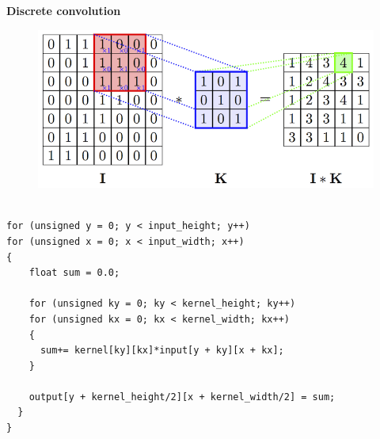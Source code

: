 \documentclass[xcolor=dvipsnames]{beamer}
\begin{document}
\begin{frame}[fragile]
{\bf Discrete convolution}

\begin{figure}
  \includegraphics[scale=0.2]{../../diagrams/convolution_2d.png}
\end{figure}


\begin{lstlisting}

for (unsigned y = 0; y < input_height; y++)
for (unsigned x = 0; x < input_width; x++)
{
    float sum = 0.0;

    for (unsigned ky = 0; ky < kernel_height; ky++)
    for (unsigned kx = 0; kx < kernel_width; kx++)
    {
      sum+= kernel[ky][kx]*input[y + ky][x + kx];
    }

    output[y + kernel_height/2][x + kernel_width/2] = sum;
  }
}
\end{lstlisting}
\end{frame}
\end{document}
